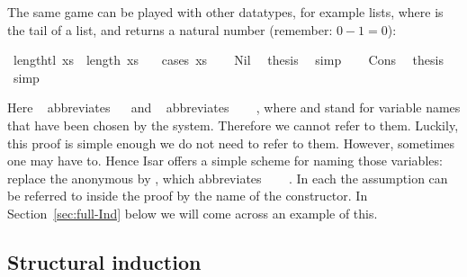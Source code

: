 \begin{isabellebody}
\begin{isamarkuptext}
The same game can be played with other datatypes, for example lists,
where  is the tail of a list, and  returns a
natural number (remember: $0-1=0$):%
\end{isamarkuptext}%
\isamarkuptrue%
\isamarkupfalse%
\ {\isachardoublequoteopen}length{\isacharparenleft}tl\ xs{\isacharparenright}\ {\isacharequal}\ length\ xs\ {\isacharminus}\ {}{\isachardoublequoteclose}\isanewline
%
\isadelimproof
%
\endisadelimproof
%
\isatagproof
{}\isamarkupfalse%
\ {\isacharparenleft}cases\ xs{\isacharparenright}\isanewline
\ \ \isamarkupfalse%
\ Nil\ \isamarkupfalse%
\ {\isacharquery}thesis\ \isamarkupfalse%
\ simp\isanewline
{}\isamarkupfalse%
\isanewline
\ \ \isamarkupfalse%
\ Cons\ \isamarkupfalse%
\ {\isacharquery}thesis\ \isamarkupfalse%
\ simp\isanewline
{}\isamarkupfalse%
%
\endisatagproof
{\isafoldproof}%
%
\isadelimproof
%
\endisadelimproof
%
\begin{isamarkuptext}%
\noindent Here ~ abbreviates
~~ and
~ abbreviates ~\isa{{\isacharquery}\ {\isacharquery}{\isacharquery}}
~~,
where \isa{{\isacharquery}} and \isa{{\isacharquery}{\isacharquery}}
stand for variable names that have been chosen by the system.
Therefore we cannot refer to them.
Luckily, this proof is simple enough we do not need to refer to them.
However, sometimes one may have to. Hence Isar offers a simple scheme for
naming those variables: replace the anonymous  by
, which abbreviates ~
~~.
In each  the assumption can be
referred to inside the proof by the name of the constructor. In
Section~\ref{sec:full-Ind} below we will come across an example
of this.

\subsection{Structural induction}


\end{isamarkuptext}
\end{isabellebody}
